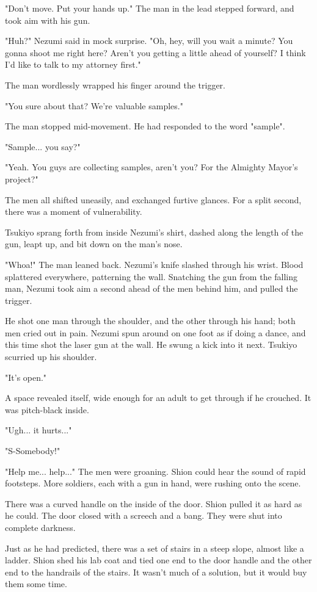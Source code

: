 "Don't move. Put your hands up." The man in the lead stepped forward,
and took aim with his gun.

"Huh?" Nezumi said in mock surprise. "Oh, hey, will you wait a minute?
You gonna shoot me right here? Aren't you getting a little ahead of
yourself? I think I'd like to talk to my attorney first."

The man wordlessly wrapped his finger around the trigger.

"You sure about that? We're valuable samples."

The man stopped mid-movement. He had responded to the word "sample".

"Sample... you say?"

"Yeah. You guys are collecting samples, aren't you? For the Almighty
Mayor's project?"

The men all shifted uneasily, and exchanged furtive glances. For a split
second, there was a moment of vulnerability.

Tsukiyo sprang forth from inside Nezumi's shirt, dashed along the length
of the gun, leapt up, and bit down on the man's nose.

"Whoa!" The man leaned back. Nezumi's knife slashed through his wrist.
Blood splattered everywhere, patterning the wall. Snatching the gun from
the falling man, Nezumi took aim a second ahead of the men behind him,
and pulled the trigger.

He shot one man through the shoulder, and the other through his hand;
both men cried out in pain. Nezumi spun around on one foot as if doing a
dance, and this time shot the laser gun at the wall. He swung a kick
into it next. Tsukiyo scurried up his shoulder.

"It's open."

A space revealed itself, wide enough for an adult to get through if he
crouched. It was pitch-black inside.

"Ugh... it hurts..."

"S-Somebody!"

"Help me... help..." The men were groaning. Shion could hear the sound
of rapid footsteps. More soldiers, each with a gun in hand, were rushing
onto the scene.

There was a curved handle on the inside of the door. Shion pulled it as
hard as he could. The door closed with a screech and a bang. They were
shut into complete darkness.

Just as he had predicted, there was a set of stairs in a steep slope,
almost like a ladder. Shion shed his lab coat and tied one end to the
door handle and the other end to the handrails of the stairs. It wasn't
much of a solution, but it would buy them some time.

